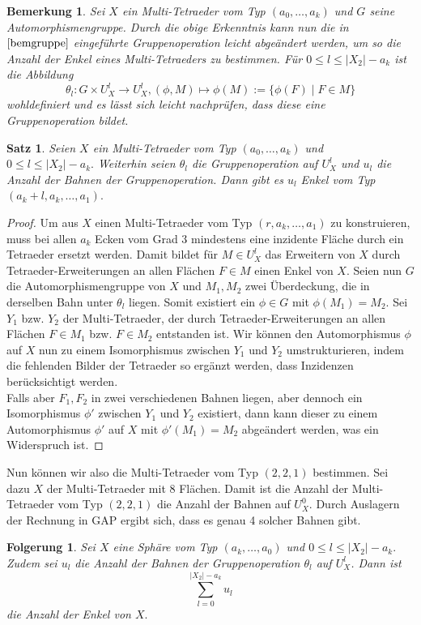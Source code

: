 \documentclass[12pt,titlepage,twoside,cleardoublepage]{article}
\theoremstyle{nummermitklammern}
\newtheorem{folgerung}[temp]{Folgerung}
\newtheorem{bemerkung}[temp]{Bemerkung}
\newtheorem{satz}[temp]{Satz}
\newtheorem{folgerung}[zahl]{Folgerung}
\newtheorem{bemerkung}[zahl]{Bemerkung}
\newtheorem{satz}[zahl]{Satz}
\numberwithin{equation}{section}
\begin{document}
\begin{bemerkung}
Sei $X$ ein Multi-Tetraeder vom Typ $(a_0,\ldots ,a_k)$ und $G$ seine Automorphismengruppe.
Durch die obige Erkenntnis kann nun die in $\Cref{bemgruppe}$ eingeführte Gruppenoperation leicht abgeändert werden, um so die Anzahl der Enkel eines Multi-Tetraeders zu bestimmen. Für $0\leq l\leq \vert X_2 \vert -a_k$ ist die Abbildung
\[
\theta_l: G\times U_X^l \to U_X^l, (\phi, M)\mapsto \phi(M):=\{\phi(F)\mid F\in M\}
\] 
wohldefiniert und es lässt sich leicht nachprüfen, dass diese eine Gruppenoperation bildet.
\end{bemerkung}
\begin{satz}
Seien $X$ ein Multi-Tetraeder vom Typ $(a_0,\ldots,a_k)$ und $0\leq l\leq \vert X_2\vert -a_k.$ Weiterhin seien $\theta_l$ die Gruppenoperation auf $U_X^l$ und $u_l$ die Anzahl der Bahnen der Gruppenoperation. Dann gibt es $u_l$ Enkel vom Typ $(a_k+l,a_k,\ldots,a_1).$
\end{satz}
\begin{proof}
Um aus $X$ einen Multi-Tetraeder vom Typ $(r,a_k,\ldots,a_1)$ zu konstruieren, muss bei allen $a_k$ Ecken vom Grad 3 mindestens eine inzidente Fläche durch ein Tetraeder ersetzt werden. Damit bildet für $M\in U_X^l$ das Erweitern von $X$ durch Tetraeder-Erweiterungen an allen Flächen $F\in M$ einen Enkel von $X$. Seien nun $G$ die Automorphismengruppe von $X$ und $M_1,M_2$ zwei Überdeckung, die in derselben Bahn unter $\theta_l$ liegen. Somit existiert ein $\phi \in G$ mit $\phi(M_1)=M_2.$ Sei $Y_1$ bzw. $Y_2$ der Multi-Tetraeder, der durch Tetraeder-Erweiterungen an allen Flächen $F\in M_1$ bzw. $F \in M_2$ entstanden ist. Wir können den Automorphismus $\phi$ auf $X$ nun zu einem Isomorphismus zwischen $Y_1$ und $Y_2$ umstrukturieren, indem die fehlenden Bilder der Tetraeder so ergänzt werden, dass Inzidenzen berücksichtigt werden. \\
Falls aber $F_1,F_2$ in zwei verschiedenen Bahnen liegen, aber dennoch ein Isomorphismus $\phi'$ zwischen $Y_1$ und $Y_2$ existiert, dann kann dieser zu einem Automorphismus $\phi'$ auf $X$ mit $\phi'(M_1)=M_2$ abgeändert werden, was ein Widerspruch ist.
\end{proof}
Nun können wir also die Multi-Tetraeder vom Typ $(2,2,1)$ bestimmen. Sei dazu $X$ der Multi-Tetraeder mit 8 Flächen.
Damit ist die Anzahl der Multi-Tetraeder vom Typ $(2,2,1)$ die Anzahl der Bahnen auf $U^0_X.$ Durch Auslagern der Rechnung in GAP ergibt sich, dass es genau 4 solcher Bahnen gibt.
\begin{folgerung}
Sei $X$ eine Sphäre vom Typ $(a_k,\ldots, a_0)$ und $0\leq l\leq \vert X_2\vert -a_k.$ Zudem sei $u_l$ die Anzahl der Bahnen der Gruppenoperation $\theta_l$ auf $U_X^l$. Dann ist 
\[
\sum_{l=0}^{\vert X_2\vert -a_k} u_l
\] die Anzahl der Enkel von $X.$
\end{folgerung}
\end{document}
